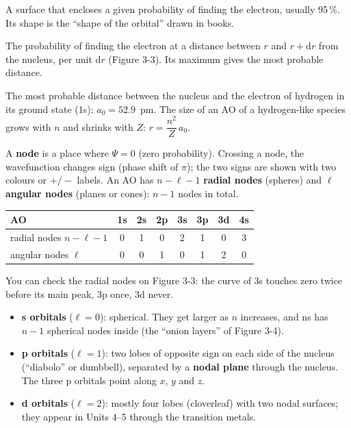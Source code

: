 \begin{concept}
A surface that encloses a given probability of finding the electron, usually 95\,\%. Its shape is the
``shape of the orbital'' drawn in books.
\end{concept}
\begin{concept}
The probability of finding the electron at a distance between $r$ and $r + \mathrm dr$ from the nucleus,
per unit $\mathrm dr$ (Figure 3-3). Its maximum gives the most probable distance.
\end{concept}
\begin{concept}
The most probable distance between the nucleus and the electron of hydrogen in its ground state (1s):
$a_0 = 52.9$~pm. The size of an AO of a hydrogen-like species grows with $n$ and shrinks with $Z$:
$\boxed{r = \dfrac{n^2}{Z}\,a_0}$.
\end{concept}
\begin{concept}
A \textbf{node} is a place where $\Psi = 0$ (zero probability). Crossing a node, the wavefunction changes
sign (phase shift of $\pi$); the two signs are shown with two colours or $+/-$ labels. An AO has
$n - \ell - 1$ \textbf{radial nodes} (spheres) and $\ell$ \textbf{angular nodes} (planes or cones):
$n-1$ nodes in total.
\end{concept}
\begin{center}\small
\begin{tabular}{@{}l *{7}{c}@{}}
\toprule
AO & 1s & 2s & 2p & 3s & 3p & 3d & 4s\\ \midrule
radial nodes $n-\ell-1$ & 0 & 1 & 0 & 2 & 1 & 0 & 3\\
angular nodes $\ell$ & 0 & 0 & 1 & 0 & 1 & 2 & 0\\ \bottomrule
\end{tabular}
\end{center}
You can check the radial nodes on Figure 3-3: the curve of 3s touches zero twice before its main peak,
3p once, 3d never.
\begin{itemize}
  \item \textbf{s orbitals} ($\ell = 0$): spherical. They get larger as $n$ increases, and ns has $n-1$
        spherical nodes inside (the ``onion layers'' of Figure 3-4).
  \item \textbf{p orbitals} ($\ell = 1$): two lobes of opposite sign on each side of the nucleus
        (``diabolo'' or dumbbell), separated by a \textbf{nodal plane} through the nucleus. The three p
        orbitals point along $x$, $y$ and $z$.
  \item \textbf{d orbitals} ($\ell = 2$): mostly four lobes (cloverleaf) with two nodal surfaces; they
        appear in Units 4--5 through the transition metals.
\end{itemize}
